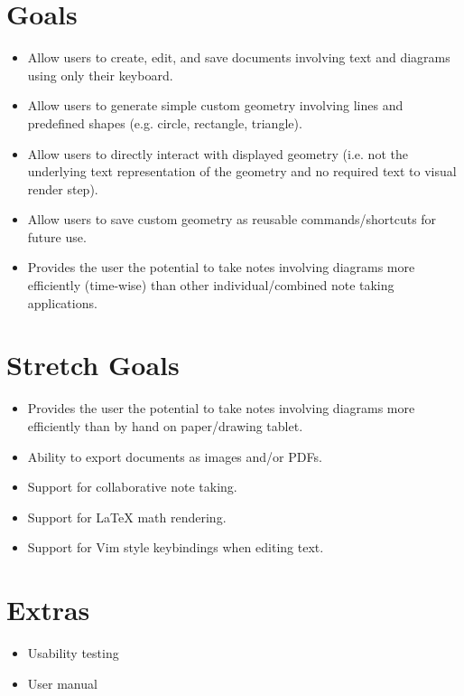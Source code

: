 \documentclass{article}
\begin{document}
\section{Goals}
\begin{itemize}
  \item Allow users to create, edit, and save documents involving text and
    diagrams using only their keyboard.
  \item Allow users to generate simple custom geometry involving lines and
    predefined shapes (e.g. circle, rectangle, triangle).
  \item Allow users to directly interact with displayed geometry (i.e. not the
    underlying text representation of the geometry and no required text to
    visual render step).
  \item Allow users to save custom geometry as reusable commands/shortcuts for
    future use.
  \item Provides the user the potential to take notes involving diagrams more
    efficiently (time-wise) than other individual/combined note taking
    applications.
\end{itemize}

\section{Stretch Goals}
\begin{itemize}
  \item Provides the user the potential to take notes involving diagrams more
    efficiently than by hand on paper/drawing tablet.
  \item Ability to export documents as images and/or PDFs.
  \item Support for collaborative note taking.
  \item Support for LaTeX math rendering.
  \item Support for Vim style keybindings when editing text.
\end{itemize}

\section{Extras}
\begin{itemize}
  \item Usability testing
  \item User manual
\end{itemize}

\end{document}
